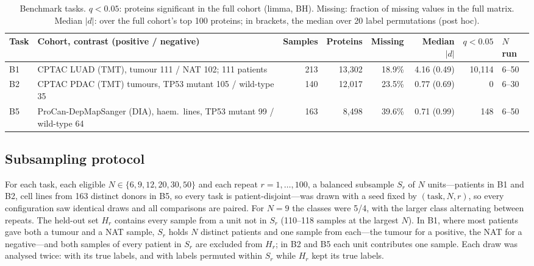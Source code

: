 \documentclass[10pt,letterpaper]{article}
\begin{document}
\begin{table}[t]
\centering
\caption{Benchmark tasks. $q<0.05$: proteins significant in the full cohort (limma, BH). Missing: fraction
of missing values in the full matrix. Median $|d|$: over the full cohort's top 100 proteins; in brackets,
the median over 20 label permutations (post hoc).}
\label{tab:tasks}
\begin{tabularx}{\textwidth}{@{}l X r r r r r l@{}}
\toprule
Task & Cohort, contrast (positive / negative) & Samples & Proteins & Missing & Median $|d|$ & $q<0.05$ & $N$ run \\
\midrule
B1 & CPTAC LUAD (TMT), tumour 111 / NAT 102; 111 patients & 213 & 13,302 & 18.9\% & 4.16 (0.49) & 10,114 & 6--50 \\
B2 & CPTAC PDAC (TMT) tumours, TP53 mutant 105 / wild-type 35 & 140 & 12,017 & 23.5\% & 0.77 (0.69) & 0 & 6--30 \\
B5 & ProCan-DepMapSanger (DIA), haem.\ lines, TP53 mutant 99 / wild-type 64 & 163 & 8,498 & 39.6\% & 0.71 (0.99) & 148 & 6--50 \\
\bottomrule
\end{tabularx}
\end{table}

\subsection{Subsampling protocol}
For each task, each eligible $N \in \{6, 9, 12, 20, 30, 50\}$ and each repeat $r = 1, \dots, 100$, a balanced
subsample $S_r$ of $N$ units---patients in B1 and B2, cell lines from 163 distinct donors in B5, so every task is
patient-disjoint---was drawn with a seed fixed by
$(\text{task}, N, r)$, so every configuration saw identical draws and all comparisons are paired. For $N = 9$
the classes were 5/4, with the larger class alternating between repeats. The held-out set $H_r$ contains
every sample from a unit not in $S_r$ (110--118 samples at the largest $N$). In B1, where most patients gave
both a tumour and a NAT sample, $S_r$ holds $N$ distinct patients and one sample from each---the tumour for a
positive, the NAT for a negative---and both samples of every patient in $S_r$ are excluded from $H_r$; in B2
and B5 each unit contributes one sample. Each draw was analysed twice: with its true labels, and with labels
permuted within $S_r$ while $H_r$ kept its true labels.
\end{document}
